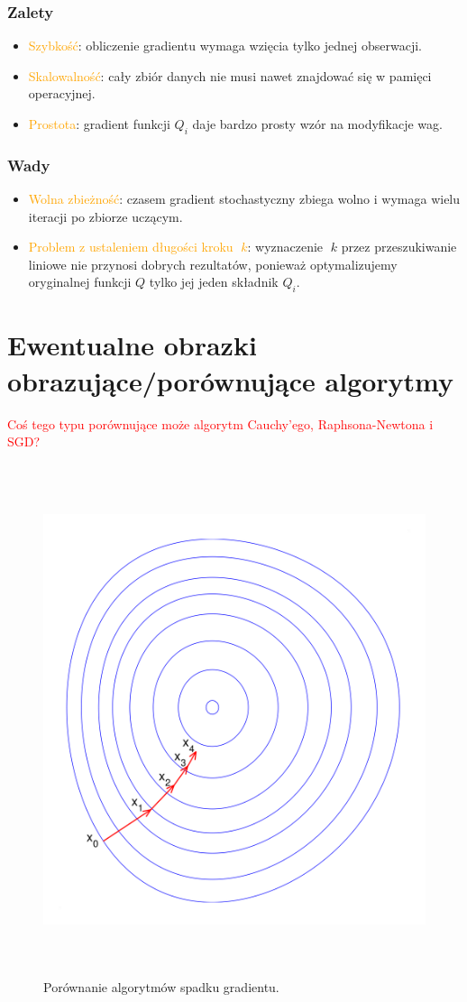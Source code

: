 \subsubsection{Zalety}
\begin{itemize}
\item \textcolor{orange}{Szybkość}: obliczenie gradientu wymaga wzięcia tylko jednej
obserwacji.
\item \textcolor{orange}{Skalowalność}: cały zbiór danych nie musi nawet znajdować się
w pamięci operacyjnej.
\item \textcolor{orange}{Prostota}: gradient funkcji  $Q_{i}$ daje bardzo prosty wzór na
modyfikacje wag.
\end{itemize}

\subsubsection{Wady}
\begin{itemize}
\item \textcolor{orange}{Wolna zbieżność}: czasem gradient stochastyczny zbiega wolno
i wymaga wielu iteracji po zbiorze uczącym.
\item \textcolor{orange}{Problem z ustaleniem długości kroku $k$}: wyznaczenie $k$
przez przeszukiwanie liniowe nie przynosi dobrych rezultatów,
ponieważ optymalizujemy oryginalnej funkcji $Q$ tylko jej jeden
składnik $Q_{i}$.
\end{itemize}

\section{Ewentualne obrazki obrazujące/porównujące algorytmy}

\textcolor{red}{Coś tego typu porównujące może algorytm Cauchy'ego, Raphsona-Newtona i SGD?}

\begin{figure}[h]
\includegraphics[width=\textwidth, height=15cm]{Obrazki/gd}
\caption{Porównanie algorytmów spadku gradientu.}
\end{figure}

